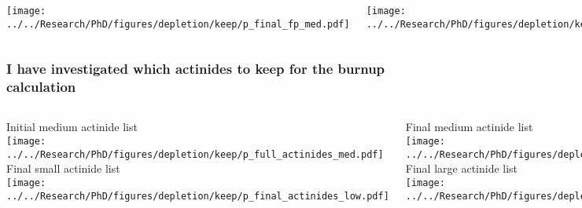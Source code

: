 \documentclass[compress,10pt]{beamer}
\begin{document}
\begin{frame}
\begin{columns}[c]
        \centering
        {}\texttt{[image: ../../Research/PhD/figures/depletion/keep/p\_final\_fp\_med.pdf]} \\


        \centering
        {}\texttt{[image: ../../Research/PhD/figures/depletion/keep/p\_final\_fp\_high.pdf]} \\


        \centering
        {}\texttt{[image: ../../Research/PhD/figures/depletion/keep/p\_final\_fp\_all.pdf]} \\

    \end{columns}

\end{frame}

\typeout{***********************************************************************************}

\begin{frame}
    \frametitle{I have investigated which actinides to keep for the burnup calculation}

    \centering
    \begin{columns}[c]


        \centering
        {\footnotesize Initial medium actinide list} \\
        {}\texttt{[image: ../../Research/PhD/figures/depletion/keep/p\_full\_actinides\_med.pdf]} \\

        {\footnotesize Final small actinide list} \\
        {}\texttt{[image: ../../Research/PhD/figures/depletion/keep/p\_final\_actinides\_low.pdf]} \\


        \centering

        {\footnotesize Final medium actinide list} \\
        {}\texttt{[image: ../../Research/PhD/figures/depletion/keep/p\_final\_actinides\_med.pdf]} \\

        {\footnotesize Final large actinide list} \\
        {}\texttt{[image: ../../Research/PhD/figures/depletion/keep/p\_final\_actinides\_high.pdf]} \\

    \end{columns}

\end{frame}
\end{document}
